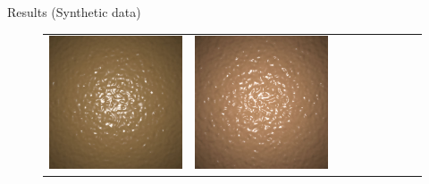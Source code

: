 \documentclass[final]{beamer}
\newlength{\twocolwid}
\newlength{\resultwidth}
\begin{document}
\begin{frame}[t]
\begin{columns}[t]
\begin{column}{\twocolwid}
\begin{block}{Results (Synthetic data)}
\begin{figure}[t]
\begin{tabular}{ccrclcccc}
            		\includegraphics[width=\resultwidth]{synth/bump/good3.jpg} &
            		\includegraphics[width=\resultwidth]{synth/bump/bad1.jpg}
            		\\

\end{tabular}
\end{figure}
\end{block}
\end{column}
\end{columns}
\end{frame}
\end{document}
